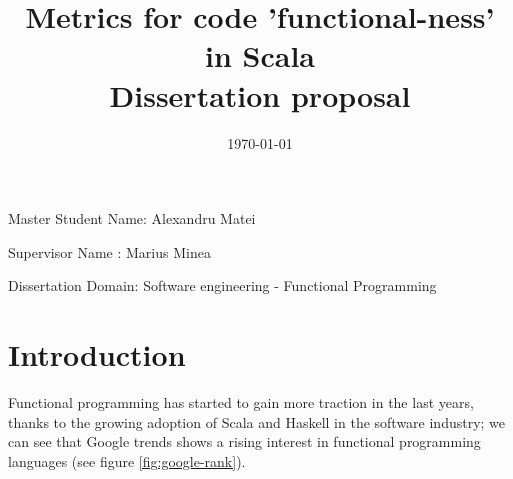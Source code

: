 \documentclass{article}
\title{Metrics for code 'functional-ness' in Scala\\Dissertation proposal  }
\date{\today}
\begin{document}
\maketitle

\vspace{30mm} %

\begin{center}
Master Student Name: Alexandru Matei \par
Supervisor Name : Marius Minea \par
Dissertation Domain: Software engineering - Functional Programming
\end{center}

\vfill

\newpage
\tableofcontents
\newpage

\section{Introduction}
Functional programming has started to gain more traction in the last years, thanks to the growing adoption of Scala and Haskell in the software industry; we can see that Google trends shows a rising interest in functional programming languages (see figure \ref{fig:google-rank}). \par
\end{document}
